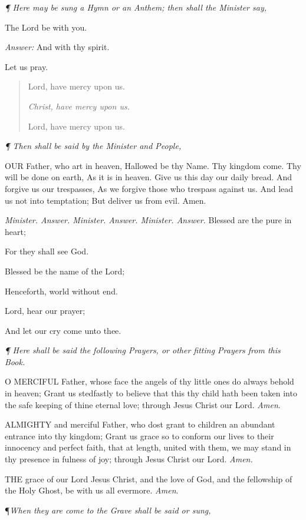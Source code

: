 \emph{¶
Here may be sung a Hymn or an Anthem; then shall the Minister say,}

The
Lord be with you.

\emph{Answer:} And with
thy spirit.

Let
us pray.

\begin{quote}

Lord,
have mercy upon us.

\emph{Christ, have mercy upon us.}

Lord, have mercy upon us.

\end{quote}

\emph{¶
Then shall be said by the Minister and People,}

OUR
Father, who art in heaven, Hallowed be thy Name. Thy kingdom come. Thy
will be done on earth, As it is in heaven. Give us this day our daily
bread. And forgive us our trespasses, As we forgive those who trespass
against us. And lead us not into temptation; But deliver us from evil.
Amen.

\emph{Minister. Answer. Minister. Answer. Minister. Answer.} Blessed
are the pure in heart;

For they shall see God.

Blessed be the name of the Lord;

Henceforth, world without end.

Lord, hear our prayer;

And let our cry come unto thee.

\emph{¶
Here shall be said the following Prayers, or other fitting Prayers from
this Book.}

O
MERCIFUL Father, whose face the angels of thy little ones do always behold
in heaven; Grant us stedfastly to believe that this thy child hath been
taken into the safe keeping of thine eternal love; through Jesus Christ
our Lord. \emph{Amen}.

ALMIGHTY
and merciful Father, who dost grant to children an abundant entrance into
thy kingdom; Grant us grace so to conform our lives to their innocency
andperfect faith, that at length, united with them, we may stand in thy
presence in fulness of joy; through Jesus Christ our Lord. \emph{Amen.}

THE
grace of our Lord Jesus Christ, and the love of God, and the fellowship
of the Holy Ghost, be with us all evermore. \emph{Amen}.

¶\emph{When they are come to the Grave shall be said or sung,}

